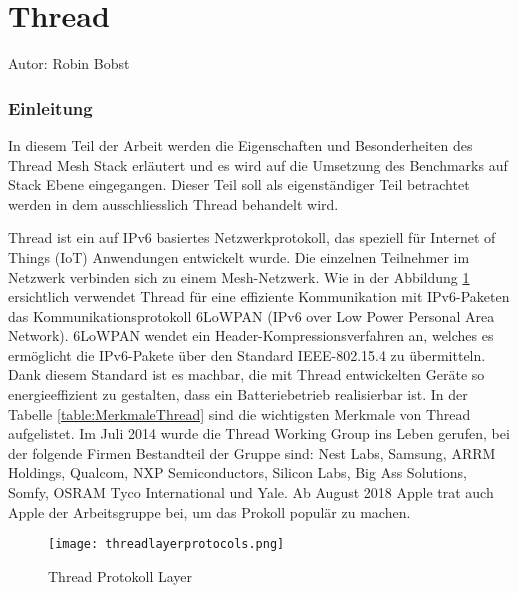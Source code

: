 \vspace*{4cm}
\part{Thread}\label{part:Thread}
Autor: Robin Bobst
\vspace*{\fill}
\clearpage

\section{Einleitung}\label{sec:EinleitungThread}
In diesem Teil der Arbeit werden die Eigenschaften und Besonderheiten des Thread Mesh Stack erläutert und es wird auf die Umsetzung des Benchmarks auf Stack Ebene eingegangen. Dieser Teil soll als eigenständiger Teil betrachtet werden in dem ausschliesslich Thread behandelt wird.

Thread ist ein auf IPv6 basiertes Netzwerkprotokoll, das speziell für Internet of Things (IoT) Anwendungen entwickelt wurde. Die einzelnen Teilnehmer im Netzwerk verbinden sich zu einem Mesh-Netzwerk. Wie in der Abbildung \ref{fig:ThreadProtokollLayer} ersichtlich verwendet Thread für eine effiziente Kommunikation mit IPv6-Paketen das Kommunikationsprotokoll 6LoWPAN (IPv6 over Low Power Personal Area Network). 6LoWPAN wendet ein Header-Kompressionsverfahren an, welches es ermöglicht die IPv6-Pakete über den Standard IEEE-802.15.4 zu übermitteln. Dank diesem Standard ist es machbar, die mit Thread entwickelten Geräte so energieeffizient zu gestalten, dass ein Batteriebetrieb realisierbar ist. In der Tabelle \ref{table:MerkmaleThread} sind die wichtigsten Merkmale von Thread aufgelistet. Im Juli 2014 wurde die Thread Working Group ins Leben gerufen, bei der folgende Firmen Bestandteil der Gruppe sind: Nest Labs, Samsung, ARRM Holdings, Qualcom, NXP Semiconductors, Silicon Labs, Big Ass Solutions, Somfy, OSRAM Tyco International und Yale. Ab August 2018 Apple trat auch Apple der Arbeitsgruppe bei, um das Prokoll populär zu machen. \cite[Kapitel 1]{thread_group_inc_thread_2017} \\

\begin{figure}[H]
	\centering
	\texttt{[image: threadlayerprotocols.png]}
	\caption{Thread Protokoll Layer \cite{erickson_picture_2019}}
	\label{fig:ThreadProtokollLayer}
\end{figure}

